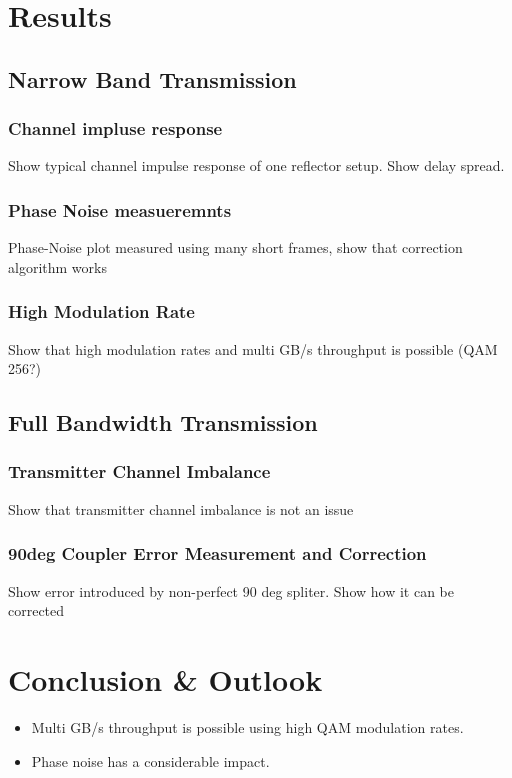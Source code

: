 \chapter{Results}
\section{Narrow Band Transmission}
\subsection{Channel impluse response}
Show typical channel impulse response of one reflector setup.
Show delay spread.

\subsection{Phase Noise measueremnts}
Phase-Noise plot measured using many short frames, show that correction algorithm works

\subsection{High Modulation Rate}
Show that high modulation rates and multi GB/s throughput is possible (QAM 256?)

\section{Full Bandwidth Transmission}
\subsection{Transmitter Channel Imbalance}
Show that transmitter channel imbalance is not an issue

\subsection{90deg Coupler Error Measurement and Correction}
Show error introduced by non-perfect 90 deg spliter. Show how it can be corrected

\chapter{Conclusion \& Outlook}
\begin{itemize}
\item Multi GB/s throughput is possible using high QAM modulation rates.
\item Phase noise has a considerable impact.

\end{itemize}
